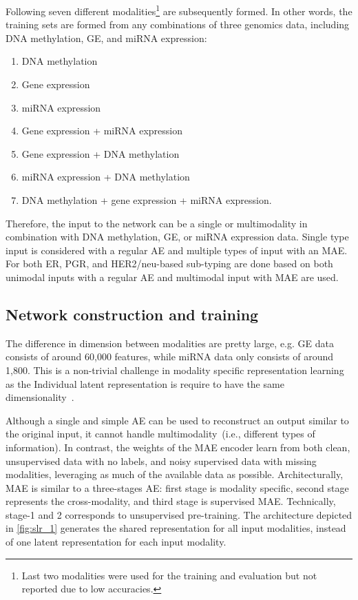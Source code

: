 \hspace*{3.5mm} Following seven different modalities\footnote{Last two modalities were used for the training and evaluation but not reported due to low accuracies.} are subsequently formed. In other words, the training sets are formed from any combinations of three genomics data, including DNA methylation, GE, and miRNA expression: 

\begin{enumerate}[noitemsep]
    \item DNA methylation 
    \item Gene expression 
    \item miRNA expression 
    \item Gene expression + miRNA expression 
    \item Gene expression + DNA methylation 
    \item miRNA expression + DNA methylation  
    \item DNA methylation + gene expression + miRNA expression. 
\end{enumerate}

Therefore, the input to the network can be a single or multimodality in combination with DNA methylation, GE, or miRNA expression data. Single type input is considered with a regular AE and multiple types of input with an MAE. For both ER, PGR, and HER2/neu-based sub-typing are done based on both unimodal inputs with a regular AE and multimodal input with MAE are used. %

\subsection{Network construction and training}
The difference in dimension between modalities are pretty large, e.g. GE data consists of around 60,000 features, while miRNA data only consists of around 1,800. This is a non-trivial challenge in modality specific representation learning as the Individual latent representation is require to have the same dimensionality~\cite{mmdcae}.

Although a single and simple AE can be used to reconstruct an output similar to the original input, it cannot handle multimodality~(i.e., different types of information). In contrast, the weights of the MAE encoder learn from both clean, unsupervised data with no labels, and noisy supervised data with missing modalities, leveraging as much of the available data as possible. Architecturally, MAE is similar to a three-stages AE: first stage is modality specific, second stage represents the cross-modality, and third stage is supervised MAE. Technically, stage-1 and 2 corresponds to unsupervised pre-training. The architecture depicted in \cref{fig:slr_1} generates the shared representation for all input modalities, instead of one latent representation for each input modality.

